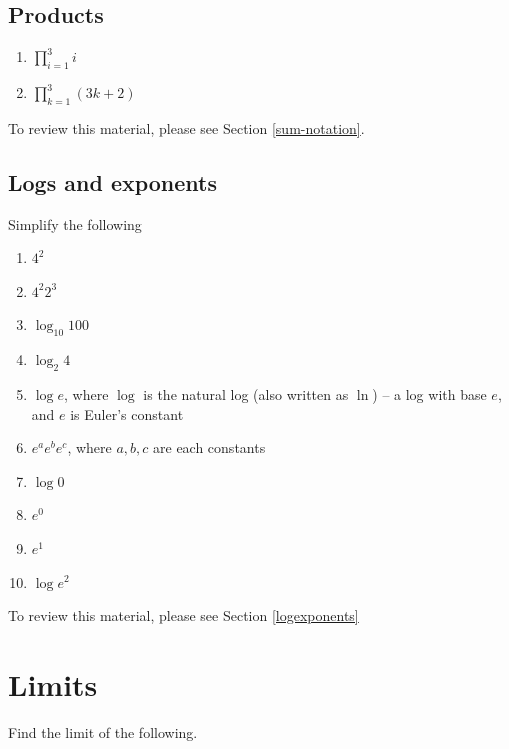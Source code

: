 \documentclass[
]{book}
\providecommand{\tightlist}{%
  \setlength{\itemsep}{0pt}\setlength{\parskip}{0pt}}
\theoremstyle{definition}
\theoremstyle{definition}
\theoremstyle{definition}
\theoremstyle{definition}
\theoremstyle{remark}
\begin{document}
\hypertarget{products}{%
\subsection*{Products}\label{products}}

\begin{enumerate}
\def\labelenumi{\arabic{enumi}.}
\item
  \(\prod\limits_{i= 1}^3 i\)
\item
  \(\prod\limits_{k=1}^3(3k + 2)\)
\end{enumerate}

To review this material, please see Section \ref{sum-notation}.

\hypertarget{logs-and-exponents}{%
\subsection*{Logs and exponents}\label{logs-and-exponents}}

Simplify the following

\begin{enumerate}
\def\labelenumi{\arabic{enumi}.}
\tightlist
\item
  \(4^2\)
\item
  \(4^2 2^3\)
\item
  \(\log_{10}100\)
\item
  \(\log_{2}4\)
\item
  \(\log e\), where \(\log\) is the natural log (also written as \(\ln\)) -- a log with base \(e\), and \(e\) is Euler's constant
\item
  \(e^a e^b e^c\), where \(a, b, c\) are each constants
\item
  \(\log 0\)
\item
  \(e^0\)
\item
  \(e^1\)
\item
  \(\log e^2\)
\end{enumerate}

To review this material, please see Section \ref{logexponents}

\hypertarget{limits}{%
\section*{Limits}\label{limits}}

Find the limit of the following.
\end{document}
